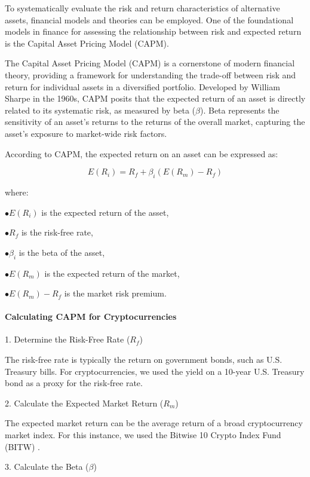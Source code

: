 \documentclass{ledger}
\begin{document}
To systematically evaluate the risk and return characteristics of alternative assets, financial models and theories can be employed. One of the foundational models in finance for assessing the relationship between risk and expected return is the Capital Asset Pricing Model (CAPM).

The Capital Asset Pricing Model (CAPM) is a cornerstone of modern financial theory, providing a framework for understanding the trade-off between risk and return for individual assets in a diversified portfolio. Developed by William Sharpe in the 1960s, CAPM posits that the expected return of an asset is directly related to its systematic risk, as measured by beta (\(\beta\)). Beta represents the sensitivity of an asset's returns to the returns of the overall market, capturing the asset's exposure to market-wide risk factors.

According to CAPM, the expected return on an asset can be expressed as:

\[
E(R_i) = R_f + \beta_i (E(R_m) - R_f)
\]

where:

$ \bullet E(R_i) $ is the expected return of the asset,

$ \bullet R_f $ is the risk-free rate,

$ \bullet \beta_i $ is the beta of the asset,

$ \bullet E(R_m) $ is the expected return of the market,

$ \bullet E(R_m) - R_f $ is the market risk premium.


\hfill \break

\paragraph{Calculating CAPM for Cryptocurrencies}

\hfill \break

1. Determine the Risk-Free Rate (\(R_f\))

The risk-free rate is typically the return on government bonds, such as U.S. Treasury bills. For cryptocurrencies, we used the yield on a 10-year U.S. Treasury bond as a proxy for the risk-free rate.

2. Calculate the Expected Market Return (\(R_m\))

The expected market return can be the average return of a broad cryptocurrency market index. For this instance, we used the Bitwise 10 Crypto Index Fund (BITW) \cite{bitw}.

3. Calculate the Beta (\(\beta\))
\end{document}
